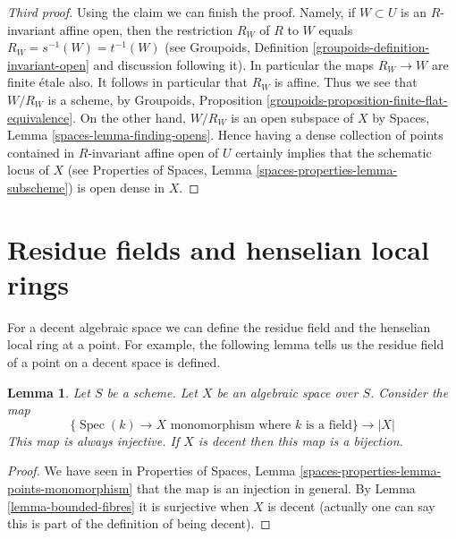 \documentclass{stacks-project}
\theoremstyle{plain}
\newtheorem{lemma}[subsection]{Lemma}
\theoremstyle{definition}
\theoremstyle{remark}
\numberwithin{equation}{subsection}
\def\Spec{\mathop{\mathrm{Spec}}}
\begin{document}
\begin{proof}[Third proof]
\medskip\noindent
Using the claim we can finish the proof. Namely, if $W \subset U$ is
an $R$-invariant affine open, then the restriction $R_W$ of $R$ to $W$
equals $R_W = s^{-1}(W) = t^{-1}(W)$ (see
Groupoids, Definition \ref{groupoids-definition-invariant-open}
and discussion following it). In particular the maps $R_W \to W$ are
finite \'etale also. It follows in particular that $R_W$ is affine.
Thus we see that $W/R_W$ is a scheme, by
Groupoids, Proposition \ref{groupoids-proposition-finite-flat-equivalence}.
On the other hand, $W/R_W$ is an open subspace of $X$ by
Spaces, Lemma \ref{spaces-lemma-finding-opens}.
Hence having a dense collection of points contained in $R$-invariant
affine open of $U$ certainly implies that the schematic locus of $X$
(see Properties of Spaces, Lemma \ref{spaces-properties-lemma-subscheme})
is open dense in $X$.
\end{proof}













\section{Residue fields and henselian local rings}
\label{section-residue-fields-henselian-local-rings}

\noindent
For a decent algebraic space we can define the residue field and the
henselian local ring at a point. For example, the following lemma
tells us the residue field of a point on a decent space is defined.

\begin{lemma}
\label{lemma-decent-points-monomorphism}
Let $S$ be a scheme. Let $X$ be an algebraic space over $S$.
Consider the map
$$
\{\Spec(k) \to X \text{ monomorphism where }k\text{ is a field}\}
\longrightarrow
|X|
$$
This map is always injective. If $X$ is decent then this map
is a bijection.
\end{lemma}

\begin{proof}
We have seen in
Properties of Spaces,
Lemma \ref{spaces-properties-lemma-points-monomorphism}
that the map is an injection in general.
By Lemma \ref{lemma-bounded-fibres} it is surjective when $X$ is
decent (actually one can say this is part of the definition
of being decent).
\end{proof}
\end{document}
